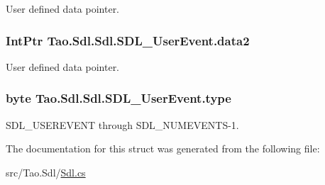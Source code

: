 User defined data pointer. 

\hypertarget{struct_tao_1_1_sdl_1_1_sdl_1_1_s_d_l___user_event_a44e085b5a784a0e85e07014be58fe54a}{
\subsubsection[{data2}]{\setlength{\rightskip}{0pt plus 5cm}IntPtr {\bf Tao.Sdl.Sdl.SDL\_\-UserEvent.data2}}}
\label{struct_tao_1_1_sdl_1_1_sdl_1_1_s_d_l___user_event_a44e085b5a784a0e85e07014be58fe54a}


User defined data pointer. 

\hypertarget{struct_tao_1_1_sdl_1_1_sdl_1_1_s_d_l___user_event_a3fd3d16ba0f9c61f4f2c5170e262e07d}{
\subsubsection[{type}]{\setlength{\rightskip}{0pt plus 5cm}byte {\bf Tao.Sdl.Sdl.SDL\_\-UserEvent.type}}}
\label{struct_tao_1_1_sdl_1_1_sdl_1_1_s_d_l___user_event_a3fd3d16ba0f9c61f4f2c5170e262e07d}


SDL\_\-USEREVENT through SDL\_\-NUMEVENTS-\/1. 



The documentation for this struct was generated from the following file:\begin{DoxyCompactItemize}
\item 
src/Tao.Sdl/\hyperlink{_sdl_8cs}{Sdl.cs}\end{DoxyCompactItemize}
